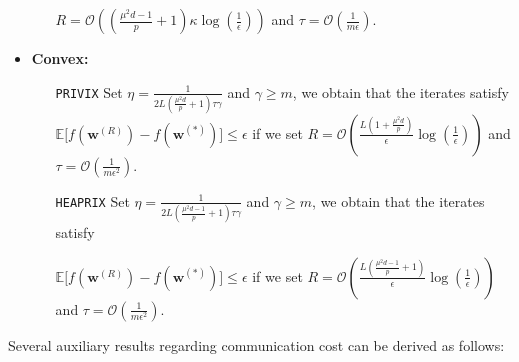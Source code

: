 \documentclass[review,onefignum,onetabnum]{siamart190516}
\begin{document}
\begin{theorem}
\begin{itemize}
\begin{itemize}
     $R=\mathcal{O}\left(\left(\frac{\mu^2d-1}{p}+1\right)\kappa\log\left(\frac{1}{\epsilon}\right)\right)$ and $ \tau=\mathcal{O}\left(\frac{1}{m\epsilon}\right)$. 
      \end{itemize}
      
     \item \textbf{Convex:}
     \begin{itemize}
         \item [\texttt{PRIVIX}] Set $\eta=\frac{1}{2L\left(\frac{\mu^2d}{p}+1\right)\tau\gamma}$ and $\gamma\geq m$, we obtain that the iterates satisfy $ \mathbb{E}\Big[f({\boldsymbol{w}}^{(R)})-f({\boldsymbol{w}}^{(*)})\Big]\leq \epsilon$ if we set
     $R=\mathcal{O}\left(\frac{L\left(1+\frac{\mu^2d}{p}\right)}{\epsilon}\log\left(\frac{1}{\epsilon}\right)\right)$ and $ \tau=\mathcal{O}\left(\frac{1}{m\epsilon^2}\right).$
         \item [\texttt{HEAPRIX}] Set $\eta=\frac{1}{2L\left(\frac{\mu^2d-1}{p}+1\right)\tau\gamma}$ and $\gamma\geq m$, we obtain that the iterates satisfy 

$ \mathbb{E}\Big[f({\boldsymbol{w}}^{(R)})-f({\boldsymbol{w}}^{(*)})\Big]\leq \epsilon$ if we set
     $R=\mathcal{O}\left(\frac{L\left(\frac{\mu^2d-1}{p}+1\right)}{\epsilon}\log\left(\frac{1}{\epsilon}\right)\right)$ and $ \tau=\mathcal{O}\left(\frac{1}{m\epsilon^2}\right).$ 
     \end{itemize}
 \end{itemize}
\end{theorem}


Several auxiliary results regarding communication cost can be derived as follows:
\end{document}
